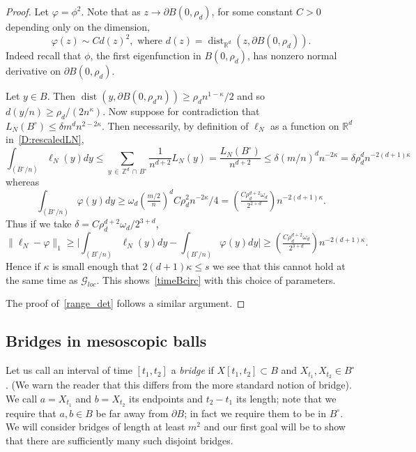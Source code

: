 \documentclass[AHL, Unicode, longabstracts, published]{cedram}
\DeclareMathOperator{\dist}{dist}
\newcommand*\Z {{\mathbb Z}}
\newcommand*\R{\mathbb{R}}
\newcommand{\cG}{\mathcal{G}}
\newcommand*\ph{\varphi}
\begin{document}
\begin{proof}
Let $\ph = \phi^2$. Note that as $z \to \partial B(0, \rho_d)$, for some constant $C>0$ depending only on the dimension,
\begin{equation}\label{radialderivative}
\ph(z) \sim C d(z)^2, \text{ where } d(z) = \dist_{\R^d} (z, \partial B(0, \rho_d)).
\end{equation}
Indeed recall that $\phi$, the first eigenfunction in $B(0, \rho_d)$, has nonzero normal derivative on $\partial B(0, \rho_d)$.

Let $y \in B$. Then $\dist (y, \partial B(0, \rho_d n)) \ge \rho_d n^{1- \kappa}/2$ and so $d (y / n) \ge \rho_d /(2 n^{\kappa})$. Now suppose for contradiction that $L_N(B^\circ) \le \delta m^dn^{2- 2\kappa}$. Then necessarily, by definition of $\ell_N$ as a function on $\R^d$ in~\eqref{D:rescaledLN},
\[
\int_{(B^\circ/n)} \ell_N (y) dy \le \sum_{y\,\in\,\Z^d\,\cap\,B^\circ} \frac1{n^{d+2}}L_N(y) = \frac{L_N(B^\circ) }{ n^{d+2}} \le \delta (m/n)^d n^{-2\kappa} =\delta \rho_d^d n^{ - 2(d+1) \kappa}
\]
whereas
\[
\int_{(B^\circ/n)} \ph(y) dy \ge \omega_d \left(\tfrac{m/2}{n}\right)^d C \rho_d^2 n^{-2 \kappa}/4 = \left(\tfrac{C \rho_d^{d+2}\omega_d }{2^{2+d}}\right) n^{ - 2(d+1) \kappa}.
\]
Thus if we take $\delta = C \rho_d^{d+2}\omega_d / 2^{3+d}$,
\[
\| \ell_N - \ph\|_1 \ge \Big| \int_{(B^\circ/n)} \ell_N(y) dy - \int_{(B^\circ/n)} \ph(y)dy \Big| \ge \left(\tfrac{C \rho_d^{d+2}\omega_d}{2^{3+d}}\right) n^{- 2(d+1) \kappa}.
\]
Hence if $\kappa$ is small enough that $2(d+1) \kappa \le s$ we see that this cannot hold at the same time as $\cG_{loc}$. This shows~\eqref{timeBcirc} with this choice of parameters.

The proof of~\eqref{range_det} follows a similar argument.
\end{proof}


\subsection{Bridges in mesoscopic balls}
\label{S:bridge_meso}

Let us call an interval of time $[t_1, t_2]$ a \emph{bridge} if $X[t_1, t_2] \subset B$ and $X_{t_1}, X_{t_2} \in B^\circ$. (We warn the reader that this differs from the more standard notion of bridge). We call $a = X_{t_1}$ and $b = X_{t_2}$ its endpoints and $t_2 - t_1$ its length; note that we require that $a, b \in B$ be far away from $\partial B$; in fact we require them to be in $B^\circ$. We will consider bridges of length at least $m^2$ and our first goal will be to show that there are sufficiently many such disjoint bridges.
\end{document}
